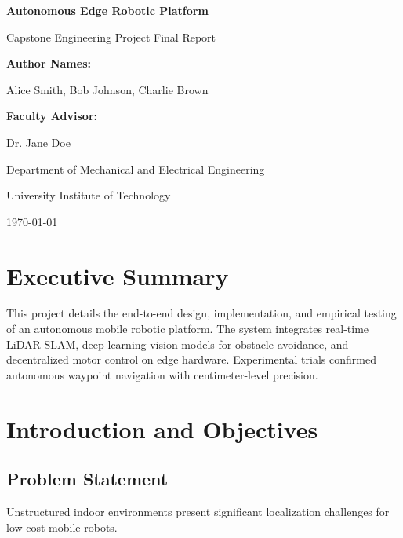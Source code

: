 \documentclass[12pt,a4paper]{report}
\begin{document}
\begin{titlepage}
    \centering
    \vspace*{1cm}
    {\Huge\bfseries Autonomous Edge Robotic Platform\par}
    \vspace{1cm}
    {\Large Capstone Engineering Project Final Report\par}
    \vspace{2cm}
    {\large\textbf{Author Names:}\par}
    {\large Alice Smith, Bob Johnson, Charlie Brown\par}
    \vspace{1cm}
    {\large\textbf{Faculty Advisor:}\par}
    {\large Dr. Jane Doe\par}
    \vfill
    {\large Department of Mechanical and Electrical Engineering\par}
    {\large University Institute of Technology\par}
    \vspace{0.8cm}
    {\large\today\par}
\end{titlepage}

\chapter*{Executive Summary}
This project details the end-to-end design, implementation, and empirical testing of an autonomous mobile robotic platform. The system integrates real-time LiDAR SLAM, deep learning vision models for obstacle avoidance, and decentralized motor control on edge hardware. Experimental trials confirmed autonomous waypoint navigation with centimeter-level precision.

\tableofcontents

\chapter{Introduction and Objectives}
\section{Problem Statement}
Unstructured indoor environments present significant localization challenges for low-cost mobile robots.
\end{document}
